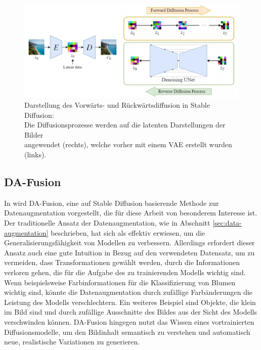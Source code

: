 \begin{figure}[h]
	\centering
	\includegraphics[width=\textwidth]{figure_stable-diffusion_merged.png}
	\caption{Darstellung des Vorwärts- und Rückwärtsdiffusion in Stable Diffusion:\\
		Die	Diffusionsprozesse werden auf die latenten Darstellungen der Bilder\\
		angewendet (rechts), welche vorher mit einem VAE erstellt wurden (links).}
	\label{fig:stable-diffusion}
\end{figure}

\subsection{DA-Fusion} \label{sec:da-fusion}

In \parencite{Trabucco2023dafusion} wird DA-Fusion, eine auf Stable Diffusion basierende Methode zur Datenaugmentation vorgestellt, die für diese Arbeit von besonderem Interesse ist. Der traditionelle Ansatz der Datenaugmentation, wie in Abschnitt \ref{sec:data-augmentation} beschrieben, hat sich als effektiv erwiesen, um die Generalisierungsfähigkeit von Modellen zu verbessern. Allerdings erfordert dieser Ansatz auch eine gute Intuition in Bezug auf den verwendeten Datensatz, um zu vermeiden, dass Transformationen gewählt werden, durch die Informationen verloren gehen, die für die Aufgabe des zu trainierenden Modells wichtig sind. Wenn beispielsweise Farbinformationen für die Klassifizierung von Blumen wichtig sind, könnte die Datenaugmentation durch zufällige Farbänderungen die Leistung des Modells verschlechtern. Ein weiteres Beispiel sind Objekte, die klein im Bild sind und durch zufällige Ausschnitte des Bildes aus der Sicht des Modells verschwinden können. DA-Fusion hingegen nutzt das Wissen eines vortrainierten Diffusionsmodelle, um den Bildinhalt semantisch zu verstehen und automatisch neue, realistische Variationen zu generieren.

